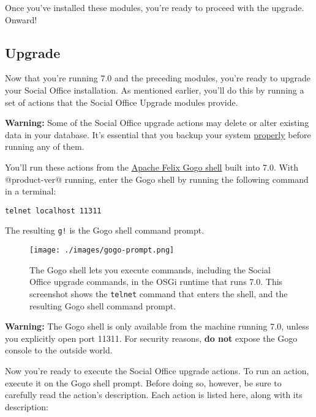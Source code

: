 Once you've installed these modules, you're ready to proceed with the
upgrade. Onward!

\subsection{Upgrade}\label{upgrade}

Now that you're running 7.0 and the preceding modules, you're ready to
upgrade your Social Office installation. As mentioned earlier, you'll do
this by running a set of actions that the Social Office Upgrade modules
provide.

\noindent\hrulefill

\textbf{Warning:} Some of the Social Office upgrade actions may delete
or alter existing data in your database. It's essential that you backup
your system
\href{/docs/7-0/deploy/-/knowledge_base/d/backing-up-a-liferay-installation}{properly}
before running any of them.

\noindent\hrulefill

You'll run these actions from the
\href{/docs/7-0/reference/-/knowledge_base/r/using-the-felix-gogo-shell}{Apache
Felix Gogo shell} built into 7.0. With @product-ver@ running, enter the
Gogo shell by running the following command in a terminal:

\begin{verbatim}
telnet localhost 11311
\end{verbatim}

The resulting \texttt{g!} is the Gogo shell command prompt.

\begin{figure}
\centering
\texttt{[image: ./images/gogo-prompt.png]}
\caption{The Gogo shell lets you execute commands, including the Social
Office upgrade commands, in the OSGi runtime that runs 7.0. This
screenshot shows the \texttt{telnet} command that enters the shell, and
the resulting Gogo shell command prompt.}
\end{figure}

\noindent\hrulefill

\textbf{Warning:} The Gogo shell is only available from the machine
running 7.0, unless you explicitly open port 11311. For security
reasons, \textbf{do not} expose the Gogo console to the outside world.

\noindent\hrulefill

Now you're ready to execute the Social Office upgrade actions. To run an
action, execute it on the Gogo shell prompt. Before doing so, however,
be sure to carefully read the action's description. Each action is
listed here, along with its description:

